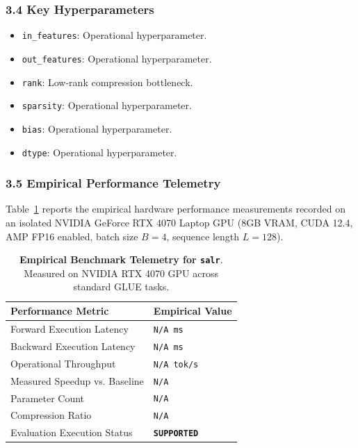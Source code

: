 \subsubsection*{3.4 Key Hyperparameters}
\begin{itemize}
    \item \texttt{in\_features}: Operational hyperparameter.
    \item \texttt{out\_features}: Operational hyperparameter.
    \item \texttt{rank}: Low-rank compression bottleneck.
    \item \texttt{sparsity}: Operational hyperparameter.
    \item \texttt{bias}: Operational hyperparameter.
    \item \texttt{dtype}: Operational hyperparameter.
\end{itemize}

\subsubsection*{3.5 Empirical Performance Telemetry}
Table~\ref{tab:telemetry_salr} reports the empirical hardware performance measurements recorded on an isolated NVIDIA GeForce RTX 4070 Laptop GPU (8GB VRAM, CUDA 12.4, AMP FP16 enabled, batch size $B=4$, sequence length $L=128$).

\begin{table}[h]
\centering
\small
\caption{\textbf{Empirical Benchmark Telemetry for \texttt{salr}}. Measured on NVIDIA RTX 4070 GPU across standard GLUE tasks.}
\label{tab:telemetry_salr}
\begin{tabularx}{\columnwidth}{lX}
\toprule
\textbf{Performance Metric} & \textbf{Empirical Value} \\
\midrule
Forward Execution Latency & \texttt{N/A ms} \\
Backward Execution Latency & \texttt{N/A ms} \\
Operational Throughput & \texttt{N/A tok/s} \\
Measured Speedup vs. Baseline & \texttt{N/A} \\
Parameter Count & \texttt{N/A} \\
Compression Ratio & \texttt{N/A} \\
Evaluation Execution Status & \textbf{\texttt{SUPPORTED}} \\
\bottomrule
\end{tabularx}
\end{table}

